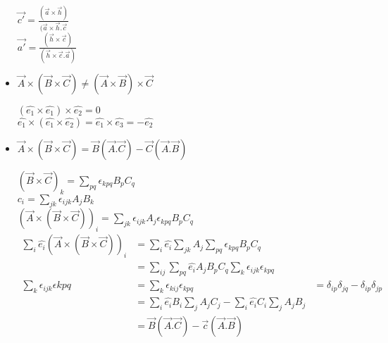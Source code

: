 \documentclass[11]{article}
\begin{document}
\begin{titlepage}
\begin{itemize}
 $ \vec{c'} =\frac{(\vec{a} \times \vec{h})}{(\vec{a} \times \vec{h}. \vec{c}}$\\
 
 $ \vec{a'}=\frac{(\vec{h} \times \vec{c})}{(\vec{h} \times \vec{c}. \vec{a})}
$\\

\item 
$\vec{A} \times (\vec{B} \times \vec{C}) \neq (\vec{A} \times \vec{B}) \times \vec{C} $

$(\hat{e_{1}} \times \hat{e_{1}}) \times \hat{e_{2}}=0$\\

$\hat{e_{1}} \times (\hat{e_{1}} \times \hat{e_{2}})=\hat{e_{1}} \times \hat{e_{3}}=-\hat{e_{2}}$\\

\item $\vec{A} \times (\vec{B} \times \vec{C})=\vec{B}(\vec{A}.\vec{C})-\vec{C}(\vec{A}.\vec{B})$

$(\vec{B}\times \vec{C})_{k} = \sum_{pq} \epsilon_{kpq} B_{p} C_{q}$\\

$c_{i}= \sum_{jk} \epsilon_{ijk} A_{j} B_{k}$\\

$(\vec{A} \times (\vec{B} \times \vec{C}))_{i} = \sum_{jk} \epsilon_{ijk} A_{j} \epsilon_{kpq} B_{p}C_{q}$\\

\begin{align*}
\sum_{i} \hat{e_{i}}(\vec{A} \times (\vec{B} \times \vec{C}))_{i} & =\sum_{i} \hat{e_{i}} \sum_{jk} A_{j} \sum_{pq} \epsilon_{kpq} B_{p} C_{q}\\
& =\sum_{ij} \sum_{pq} \hat{e_{i}} A_{j} B_{p} C_{q} \sum_{k} \epsilon_{ijk} \epsilon_{kpq}\\
\sum_{k} \epsilon_{ijk} \epsilon{kpq} & =\sum_{k} \epsilon_{kij} \epsilon_{kpq} &=\delta_{ip} \delta_{jq}-\delta_{ip} \delta_{jp}\\
& =\sum_{i} \hat{e_{i}} B_{i} \sum_{j} A_{j} C_{j}-\sum_{i} \hat{e_{i}} C_{i} \sum_{j} A_{j} B_{j}\\
& =\vec{B}(\vec{A}. \vec{C})- \vec{c}(\vec{A}.\vec{B})
\end{align*}





 
 

\end{itemize}

\end{titlepage}
\end{document}
